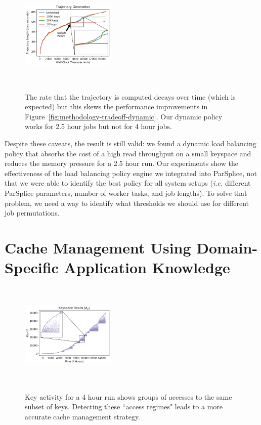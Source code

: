 \begin{figure}[t]
  \noindent\includegraphics[height=5cm,width=0.4\textwidth]{figures/methodology-trajectory.png}\\
  \caption{The rate that the trajectory is computed decays over time (which is
  expected) but this skews the performance improvements in
  Figure~\ref{fig:methodology-tradeoff-dynamic}. Our dynamic policy works for 2.5
  hour jobs but not for 4 hour jobs.  \label{fig:methodology-trajectory}}
\end{figure}

Despite these caveats, the result is still valid: we found a dynamic load
balancing policy that absorbs the cost of a high read throughput on a small
keyspace and reduces the memory pressure for a 2.5 hour run. Our experiments
show the effectiveness of the load balancing policy engine we integrated into
ParSplice, not that we were able to identify the best policy for all system
setups ({\it i.e.} different ParSplice parameters, number of worker tasks, and
job lengths).  To solve that problem, we need a way to identify what thresholds
we should use for different job permutations.

\section{Cache Management Using Domain-Specific Application Knowledge}
\label{sec:cache-management-using-domain-specific-knowledge}
\begin{figure}[t]
  \noindent\includegraphics[height=5cm,width=0.4\textwidth]{figures/keyspace-zoomed.png}\\

  \caption{Key activity for a 4 hour run shows groups of accesses to the same
  subset of keys. Detecting these ``access regimes" leads to a more accurate cache
  management strategy.\label{fig:keyspace-zoomed}}

\end{figure}

